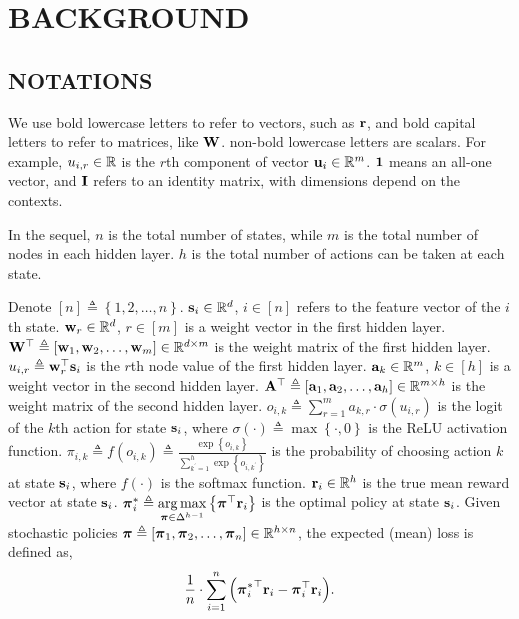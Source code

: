 \section{BACKGROUND}
\label{sec:background}

\subsection{NOTATIONS}
\label{subsec:notations}

We use bold lowercase letters to refer to vectors, such as ${\mathbf{r}}$, and bold capital letters to refer to matrices, like ${\mathbf{W}}$. non-bold lowercase letters are scalars. For example, $u_{i,r} \in {\mathbb{R}}$ is the $r$th component of vector ${\mathbf{u}}_i \in {\mathbb{R}}^m$. ${\mathbf{1}}$ means an all-one vector, and ${\mathbf{I}}$ refers to an identity matrix, with dimensions depend on the contexts.

In the sequel, $n$ is the total number of states, while $m$ is the total number of nodes in each hidden layer. $h$ is the total number of actions can be taken at each state.

Denote $[n] \triangleq \left\{ 1,2, \dots, n \right\}$. ${\mathbf{s}}_i \in {\mathbb{R}}^d$, $i \in [n]$ refers to the feature vector of the $i$th state. ${\mathbf{w}}_r \in {\mathbb{R}}^d$, $r \in [m]$ is a weight vector in the first hidden layer. ${\mathbf{W}}^\top \triangleq \left[ {\mathbf{w}}_1, {\mathbf{w}}_2, \dots, {\mathbf{w}}_m \right] \in {\mathbb{R}}^{d \times m}$ is the weight matrix of the first hidden layer. $u_{i,r} \triangleq {\mathbf{w}}_r^\top {\mathbf{s}}_i$ is the $r$th node value of the first hidden layer. ${\mathbf{a}}_k \in {\mathbb{R}}^m$, $k \in [h]$ is a weight vector in the second hidden layer. ${\mathbf{A}}^\top \triangleq \left[ {\mathbf{a}}_1, {\mathbf{a}}_2, \dots, {\mathbf{a}}_h \right] \in {\mathbb{R}}^{m \times h}$ is the weight matrix of the second hidden layer. $o_{i,k} \triangleq \sum\limits_{r=1}^{m}{a_{k,r} \cdot \sigma\left( u_{i,r} \right)}$ is the logit of the $k$th action for state ${\mathbf{s}}_i$, where $\sigma(\cdot) \triangleq \max\left\{ \cdot, 0 \right\}$ is the ReLU activation function. $\pi_{i,k} \triangleq f\left( o_{i,k} \right) \triangleq \frac{\exp\left\{ o_{i,k} \right\}}{\sum\limits_{k^\prime = 1}^{h}{\exp\left\{ o_{i,k^\prime} \right\}}}$ is the probability of choosing action $k$ at state ${\mathbf{s}}_i$, where $f(\cdot)$ is the softmax function. ${\mathbf{r}}_i \in {\mathbb{R}}^h$ is the true mean reward vector at state ${\mathbf{s}}_i$. ${\boldsymbol{\pi}}_i^* \triangleq \operatorname*{arg\,max}\limits_{{\boldsymbol{\pi}} \in \Delta^{h-1}}{\left\{ {\boldsymbol{\pi}}^\top {\mathbf{r}}_i \right\}}$ is the optimal policy at state ${\mathbf{s}}_i$. Given stochastic policies ${\boldsymbol{\pi}} \triangleq \left[ {\boldsymbol{\pi}}_1, {\boldsymbol{\pi}}_2, \dots, {\boldsymbol{\pi}}_n \right] \in {\mathbb{R}}^{h \times n}$, the expected (mean) loss is defined as,
\begin{equation}
\label{eq:expected_loss}
\begin{split}
    \frac{1}{n} \cdot \sum\limits_{i=1}^{n}{ \left( {{\boldsymbol{\pi}}_i^*}^\top {\mathbf{r}}_i - {\boldsymbol{\pi}}_i^\top {\mathbf{r}}_i \right) }.
\end{split}
\end{equation}

